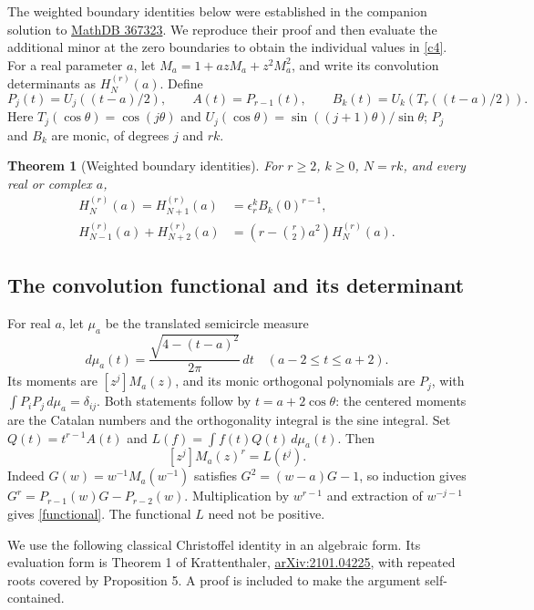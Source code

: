 \documentclass[10pt]{article}
\newtheorem{theorem}{Theorem}
\begin{document}
The weighted boundary identities below were established in the
companion solution to
\href{https://github.com/antoshashakov/Principia-Math-In-Progress/blob/mathdb-results/mathdb-open-problems/problems/367323/solution.tex}{MathDB 367323}.
We reproduce their proof and then evaluate the additional minor at
the zero boundaries to obtain the individual values in \eqref{c4}.
For a real parameter $a$, let
$M_a=1+azM_a+z^2M_a^2$, and write its convolution determinants as
$H_N^{(r)}(a)$. Define
\[
 P_j(t)=U_j((t-a)/2),\qquad A(t)=P_{r-1}(t),\qquad
 B_k(t)=U_k\!\left(T_r((t-a)/2)\right).
\]
Here $T_j(\cos\theta)=\cos(j\theta)$ and
$U_j(\cos\theta)=\sin((j+1)\theta)/\sin\theta$; $P_j$ and $B_k$
are monic, of degrees $j$ and $rk$.

\begin{theorem}[Weighted boundary identities]\label{weighted}
For $r\ge2$, $k\ge0$, $N=rk$, and every real or complex $a$,
\begin{align}
 H_N^{(r)}(a)=H_{N+1}^{(r)}(a)&=\epsilon_r^k B_k(0)^{r-1},\label{weighted1}\\
 H_{N-1}^{(r)}(a)+H_{N+2}^{(r)}(a)
 &=\left(r-\binom r2a^2\right)H_N^{(r)}(a).\label{weighted2}
\end{align}
\end{theorem}

\subsection*{The convolution functional and its determinant}

For real $a$, let $\mu_a$ be the translated semicircle measure
\[
 d\mu_a(t)=\frac{\sqrt{4-(t-a)^2}}{2\pi}\,dt\quad(a-2\le t\le a+2).
\]
Its moments are $[z^j]M_a(z)$, and its monic orthogonal polynomials
are $P_j$, with $\int P_iP_j\,d\mu_a=\delta_{ij}$. Both statements
follow by $t=a+2\cos\theta$: the centered moments are the Catalan
numbers and the orthogonality integral is the sine integral.
Set $Q(t)=t^{r-1}A(t)$ and $L(f)=\int f(t)Q(t)\,d\mu_a(t)$.
Then
\begin{equation}\label{functional}
 [z^j]M_a(z)^r=L(t^j).
\end{equation}
Indeed $G(w)=w^{-1}M_a(w^{-1})$ satisfies $G^2=(w-a)G-1$,
so induction gives $G^r=P_{r-1}(w)G-P_{r-2}(w)$. Multiplication
by $w^{r-1}$ and extraction of $w^{-j-1}$ gives \eqref{functional}.
The functional $L$ need not be positive.

We use the following classical Christoffel identity in an algebraic
form. Its evaluation form is Theorem 1 of Krattenthaler,
\href{https://arxiv.org/abs/2101.04225}{arXiv:2101.04225}, with
repeated roots covered by Proposition 5. A proof is included to make
the argument self-contained.
\end{document}
